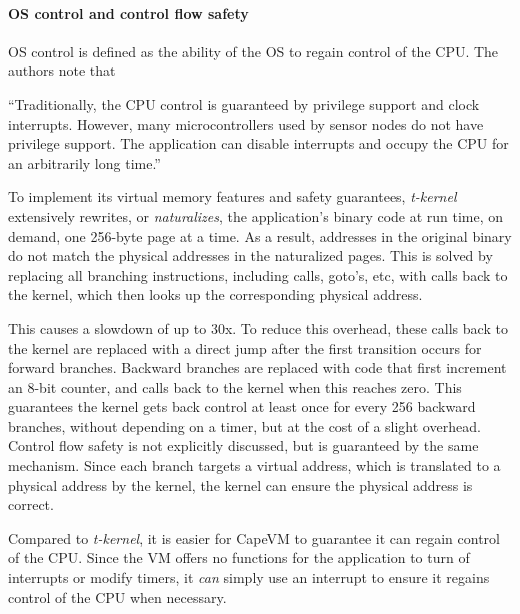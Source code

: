\paragraph{OS control and control flow safety}
OS control is defined as the ability of the OS to regain control of the CPU. The authors note that

\begin{displayquote}“Traditionally, the CPU control is guaranteed by privilege support and clock interrupts. However, many microcontrollers used by sensor nodes do not have privilege support. The application can disable interrupts and occupy the CPU for an arbitrarily long time.”\end{displayquote}

To implement its virtual memory features and safety guarantees, \emph{t-kernel} extensively rewrites, or \emph{naturalizes}, the application's binary code at run time, on demand, one 256-byte page at a time. As a result, addresses in the original binary do not match the physical addresses in the naturalized pages. This is solved by replacing all branching instructions, including calls, goto's, etc, with calls back to the kernel, which then looks up the corresponding physical address.

This causes a slowdown of up to 30x. To reduce this overhead, these calls back to the kernel are replaced with a direct jump after the first transition occurs for forward branches. Backward branches are replaced with code that first increment an 8-bit counter, and calls back to the kernel when this reaches zero. This guarantees the kernel gets back control at least once for every 256 backward branches, without depending on a timer, but at the cost of a slight overhead. Control flow safety is not explicitly discussed, but is guaranteed by the same mechanism. Since each branch targets a virtual address, which is translated to a physical address by the kernel, the kernel can ensure the physical address is correct.

Compared to \emph{t-kernel}, it is easier for CapeVM to guarantee it can regain control of the CPU. Since the VM offers no functions for the application to turn of interrupts or modify timers, it \emph{can} simply use an interrupt to ensure it regains control of the CPU when necessary.


